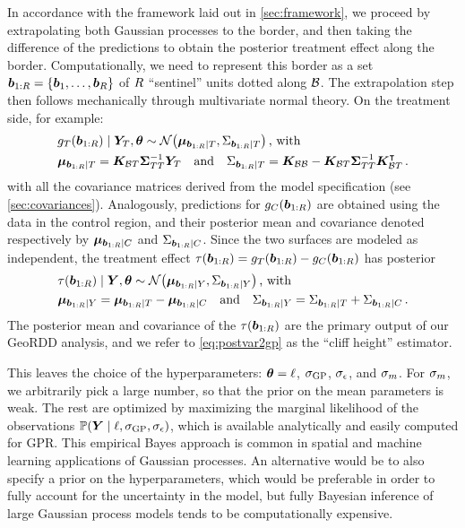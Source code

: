 In accordance with the framework laid out in \autoref{sec:framework}, we proceed by extrapolating both Gaussian processes to the border,
and then taking the difference of the predictions to obtain the posterior treatment effect along the border.
Computationally, we need to represent this border as a set \(\bm{b}_{1:R}=\left\lbrace\bm{b}_1,\ldots,\bm{b}_R\right\rbrace\) of \(R\) ``sentinel'' units dotted along \(\mathcal{B}\).
The extrapolation step then follows mechanically through multivariate normal theory.
On the treatment side, for example:
\begin{equation}\begin{split}
    & g_\treat{}(\sentinels) \mid \yt{}, \hyperparam \sim \normal\del{\muvec_{\sentinels \mid T}, \Sigma_{\sentinels \mid T}} \,\text{, with} \\
    & \muvec_{\sentinels \mid T} =
    \KBT
    \STT^{-1} 
    \yt{} 
    \quad\text{and}\quad
    \Sigma_{\sentinels \mid T} =
    \KBB - \KBT \STT^{-1} \KBT\trans \,.
\end{split}
\label{eq:postvar2gp_t_or_c}
\end{equation}
with all the covariance matrices derived from the model specification (see \autoref{sec:covariances}).
Analogously, predictions for \(g_C{}(\bm{b}_{1:R})\) are obtained using the data in the control region,
and their posterior mean and covariance denoted respectively by \(\bm{\mu}_{\bm{b}_{1:R} \mid C}\) and \(\Sigma_{\bm{b}_{1:R} \mid C}\).
Since the two surfaces are modeled as independent, the treatment effect \(\tau(\bm{b}_{1:R})=g_T{}(\bm{b}_{1:R})-g_C{}(\bm{b}_{1:R})\) has posterior
\begin{equation}
    \begin{split}
        & \tau(\sentinels) \mid \Yvec, \hyperparam \sim \normal\del{\muvec_{\sentinels \mid Y}, \Sigma_{\sentinels \mid Y}} \,\text{, with}\\
        & \muvec_{\sentinels \mid Y} = \muvec_{\sentinels \mid \treat} - \muvec_{\sentinels \mid \ctrol} \quad\text{and}\quad
        \Sigma_{\sentinels \mid Y} = \Sigma_{\sentinels \mid \treat} + \Sigma_{\sentinels \mid \ctrol} \,.
    \end{split}
    \label{eq:postvar2gp}
\end{equation}
The posterior mean and covariance of the \(\tau(\bm{b}_{1:R})\) are the primary output of our GeoRDD analysis, and we refer to \autoref{eq:postvar2gp} as the ``cliff height'' estimator.

This leaves the choice of the hyperparameters: \(\bm{\theta}=\ell\), \(\sigma_{\mathrm{GP}}\), \(\sigma_{\epsilon}\), and \(\sigma_{m}\).
For \(\sigma_{m}\), we arbitrarily pick a large number, so that the prior on the mean parameters is weak.
The rest are optimized by maximizing the marginal likelihood of the observations \(\Pr\del{\Yvec \mid \ell, \sigmaf, \sigman}\), which is available analytically and easily computed for GPR.
This empirical Bayes approach is common in spatial and machine learning applications of Gaussian processes.
An alternative would be to also specify a prior on the hyperparameters, which would be preferable in order to fully account for the uncertainty in the model, but fully Bayesian inference of large Gaussian process models tends to be computationally expensive.

